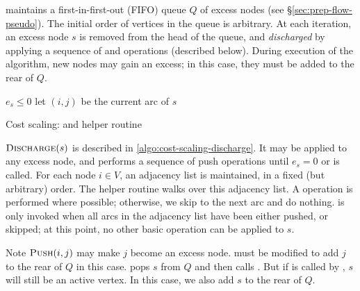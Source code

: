 maintains a first-in-first-out (FIFO) queue $Q$ of excess nodes (see \S\ref{sec:prep-flow-pseudo}). The initial order of vertices in the queue is arbitrary. At each iteration, an excess node $s$ is removed from the head of the queue, and \emph{discharged} by applying a sequence of  and  operations (described below). During execution of the algorithm, new nodes may gain an excess; in this case, they must be added to the rear of $Q$.

\begin{algorithm}
\begin{algorithmic}[1]
        \Repeat
            \State {}
        \Until $e_s \leq 0$
    \EndFunction
    \setcounter{ALG@line}{0}
    \Statex
        \State let $(i,j)$ be the current arc of $s$
         
        \Else
                \State {}
            \Else
            \EndIf
        \EndIf
    \EndFunction
\end{algorithmic}
\caption{Cost scaling:  and helper routine }
\label{algo:cost-scaling-discharge}
\end{algorithm}

$\textproc{Discharge}(s)$ is described in \cref{algo:cost-scaling-discharge}. It may be applied to any excess node, and performs a sequence of push operations until $e_s = 0$ or  is called. For each node $i \in V$, an adjacency list is maintained, in a fixed (but arbitrary) order. The helper routine  walks over this adjacency list. A  operation is performed where possible; otherwise, we skip to the next arc and do nothing.  is only invoked when all arcs in the adjacency list have been either pushed, or skipped; at this point, no other basic operation can be applied to $s$.

Note $\textproc{Push}(i,j)$ may make $j$ become an excess node.  must be modified to add $j$ to the rear of $Q$ in this case.  pops $s$ from $Q$ and then calls . But if  is called by , $s$ will still be an active vertex. In this case, we also add $s$ to the rear of $Q$\footnotemark.\\

